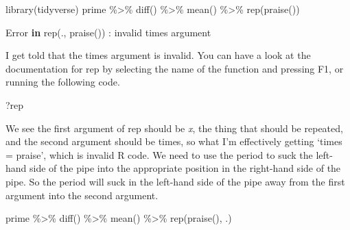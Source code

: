 \documentclass[
]{article}
\newenvironment{Shaded}{\begin{snugshade}}{\end{snugshade}}
\newcommand{\ControlFlowTok}[1]{\textcolor[rgb]{0.13,0.29,0.53}{\textbf{#1}}}
\newcommand{\FunctionTok}[1]{\textcolor[rgb]{0.00,0.00,0.00}{#1}}
\newcommand{\NormalTok}[1]{#1}
\newcommand{\SpecialCharTok}[1]{\textcolor[rgb]{0.00,0.00,0.00}{#1}}
\newcommand{\StringTok}[1]{\textcolor[rgb]{0.31,0.60,0.02}{#1}}
\begin{document}
\begin{Shaded}
\begin{Highlighting}[]
\FunctionTok{library}\NormalTok{(tidyverse)}
\NormalTok{prime }\SpecialCharTok{\%\textgreater{}\%}
  \FunctionTok{diff}\NormalTok{() }\SpecialCharTok{\%\textgreater{}\%}
  \FunctionTok{mean}\NormalTok{() }\SpecialCharTok{\%\textgreater{}\%}
  \FunctionTok{rep}\NormalTok{(}\FunctionTok{praise}\NormalTok{())}
\end{Highlighting}
\end{Shaded}

\begin{Shaded}
\begin{Highlighting}[]
\NormalTok{Error }\ControlFlowTok{in} \FunctionTok{rep}\NormalTok{(., }\FunctionTok{praise}\NormalTok{()) }\SpecialCharTok{:}\NormalTok{ invalid }\StringTok{\textquotesingle{}times\textquotesingle{}}\NormalTok{ argument}
\end{Highlighting}
\end{Shaded}

I get told that the times argument is invalid. You can have a look at the documentation for rep by selecting the name of the function and pressing F1, or running the following code.

\begin{Shaded}
\begin{Highlighting}[]
\NormalTok{?rep}
\end{Highlighting}
\end{Shaded}

We see the first argument of rep should be \emph{x}, the thing that should be repeated, and the second argument should be times, so what I'm effectively getting `times = praise', which is invalid R code. We need to use the period to suck the left-hand side of the pipe into the appropriate position in the right-hand side of the pipe. So the period will suck in the left-hand side of the pipe away from the first argument into the second argument.

\begin{Shaded}
\begin{Highlighting}[]
\NormalTok{prime }\SpecialCharTok{\%\textgreater{}\%}
  \FunctionTok{diff}\NormalTok{() }\SpecialCharTok{\%\textgreater{}\%}
  \FunctionTok{mean}\NormalTok{() }\SpecialCharTok{\%\textgreater{}\%}
  \FunctionTok{rep}\NormalTok{(}\FunctionTok{praise}\NormalTok{(), .)}
\end{Highlighting}
\end{Shaded}
\end{document}
